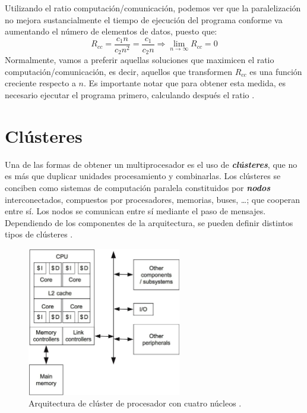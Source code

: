 \vspace{10pt}
Utilizando el ratio computación/comunicación, podemos ver que la paralelización no mejora sustancialmente el tiempo de 
ejecución del programa conforme va aumentando el número de elementos de datos, puesto que:
\begin{equation}
    R_{cc}=\frac{c_1n}{c_2n^2}=\frac{c_1}{c_2n}\Rightarrow\lim_{n\to\infty} R_{cc}=0
\end{equation}
Normalmente, vamos a preferir aquellas soluciones que maximicen el ratio computación/comunicación, es decir, aquellos
que transformen $R_{cc}$ es una función creciente respecto a $n$. Es importante notar que para obtener esta medida,
es necesario ejecutar el programa primero, calculando después el ratio \cite{wilkinson_allen_2005}.

\section{Clústeres}

Una de las formas de obtener un multiprocesador es el uso de \textbf{\textit{clústeres}}, que no es más que duplicar
unidades procesamiento y combinarlas. Los clústeres se conciben como sistemas de computación paralela constituidos por
\textbf{\textit{nodos}} interconectados, compuestos por procesadores, memorias, buses, \dots; que cooperan entre sí.
Los nodos se comunican entre sí mediante el paso de mensajes. Dependiendo de los componentes de la arquitectura, se 
pueden definir distintos tipos de clústeres \cite{czech_2017}.

\begin{figure}[htbp!]
    \centering
    \includegraphics[width=0.6\textwidth]{img/MCP.jpg}
    \caption{Arquitectura de clúster de procesador con cuatro núcleos \cite{mcp}.}
    \label{fig:mcp}
\end{figure}


